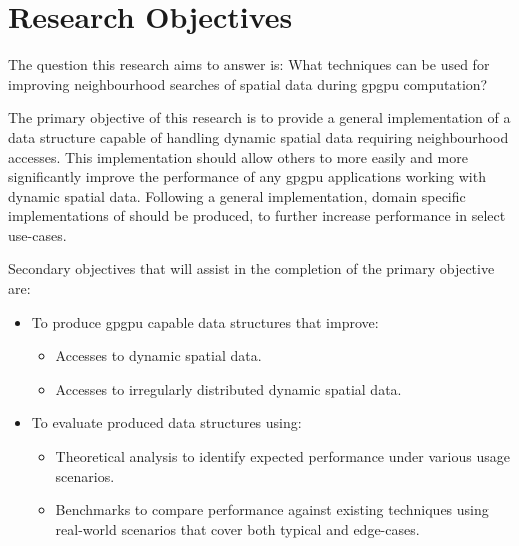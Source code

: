   \section{Research Objectives}
    The question this research aims to answer is: What techniques can be used for improving neighbourhood searches of spatial data during \gls{gpgpu} computation? 

    The primary objective of this research is to provide a general implementation of a data structure capable of handling dynamic spatial data requiring neighbourhood accesses. This implementation should allow others to more easily and more significantly improve the performance of any \gls{gpgpu} applications working with dynamic spatial data. Following a general implementation, domain specific implementations of should be produced, to further increase performance in select use-cases.

    Secondary objectives that will assist in the completion of the primary objective are:
    \begin{itemize}
      \item To produce \gls{gpgpu} capable data structures that improve:
      \begin{itemize}
        \item Accesses to dynamic spatial data.
        \item Accesses to irregularly distributed dynamic spatial data. 
      \end{itemize}
      \item To evaluate produced data structures using:
      \begin{itemize}
        \item Theoretical analysis to identify expected performance under various usage scenarios.
        \item Benchmarks to compare performance against existing techniques using real-world scenarios that cover both typical and edge-cases.
      \end{itemize}
    \end{itemize}

\begin{comment}
  \section{Contribution to Knowledge}
    \begin{itemize}
      \item Several optimistic paragraphs regarding the motivation for the research and it's potential..
    \end{itemize}
\end{comment}


